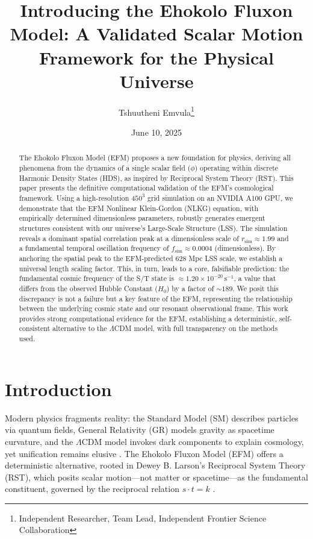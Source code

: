 \documentclass[11pt]{article}
\title{Introducing the Ehokolo Fluxon Model: A Validated Scalar Motion Framework for the Physical Universe}
\author{Tshuutheni Emvula\thanks{Independent Researcher, Team Lead, Independent Frontier Science Collaboration}}
\date{June 10, 2025}
\begin{document}
\maketitle

\begin{abstract}
The Ehokolo Fluxon Model (EFM) proposes a new foundation for physics, deriving all phenomena from the dynamics of a single scalar field (\(\phi\)) operating within discrete Harmonic Density States (HDS), as inspired by Reciprocal System Theory (RST). This paper presents the definitive computational validation of the EFM's cosmological framework. Using a high-resolution \(450^3\) grid simulation on an NVIDIA A100 GPU, we demonstrate that the EFM Nonlinear Klein-Gordon (NLKG) equation, with empirically determined dimensionless parameters, robustly generates emergent structures consistent with our universe's Large-Scale Structure (LSS). The simulation reveals a dominant spatial correlation peak at a dimensionless scale of \(r_{\text{sim}} \approx 1.99\) and a fundamental temporal oscillation frequency of \(f_{\text{sim}} \approx 0.0004\) (dimensionless). By anchoring the spatial peak to the EFM-predicted 628 Mpc LSS scale, we establish a universal length scaling factor. This, in turn, leads to a core, falsifiable prediction: the fundamental cosmic frequency of the S/T state is \(\approx 1.20 \times 10^{-20} \, \text{s}^{-1}\), a value that differs from the observed Hubble Constant (\(H_0\)) by a factor of \(\sim 189\). We posit this discrepancy is not a failure but a key feature of the EFM, representing the relationship between the underlying cosmic state and our resonant observational frame. This work provides strong computational evidence for the EFM, establishing a deterministic, self-consistent alternative to the \(\Lambda\)CDM model, with full transparency on the methods used.
\end{abstract}

\section{Introduction}
Modern physics fragments reality: the Standard Model (SM) describes particles via quantum fields, General Relativity (GR) models gravity as spacetime curvature, and the \(\Lambda\)CDM model invokes dark components to explain cosmology, yet unification remains elusive \citep{planck2018, riess2022}. The Ehokolo Fluxon Model (EFM) offers a deterministic alternative, rooted in Dewey B. Larson’s Reciprocal System Theory (RST), which posits scalar motion—not matter or spacetime—as the fundamental constituent, governed by the reciprocal relation \(s \cdot t = k\) \citep{larson1959}.
\end{document}
